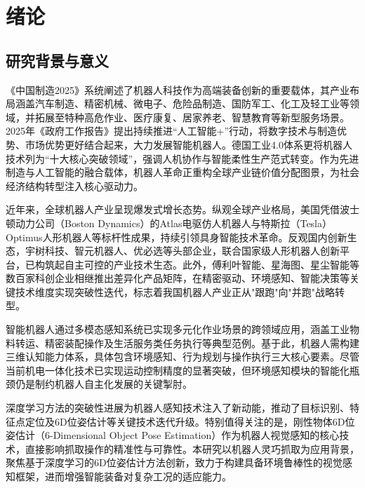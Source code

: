 \chapter{绪论}

\section{研究背景与意义}
《中国制造2025》\cite{中国制造2025}系统阐述了机器人科技作为高端装备创新的重要载体，其产业布局涵盖汽车制造、精密机械、微电子、危险品制造、国防军工、化工及轻工业等领域，并拓展至特种高危作业、医疗康复、居家养老、智慧教育等新型服务场景。2025年《政府工作报告》\cite{政府工作报告}提出持续推进“人工智能+”行动，将数字技术与制造优势、市场优势更好结合起来，大力发展智能机器人。德国工业4.0\cite{德国工业4.0}体系更将机器人技术列为“十大核心突破领域”，强调人机协作与智能柔性生产范式转变。作为先进制造与人工智能的融合载体，机器人革命正重构全球产业链价值分配图景，为社会经济结构转型注入核心驱动力。

近年来，全球机器人产业呈现爆发式增长态势\cite{2022中国智能机器人行业研究报告}。纵观全球产业格局，美国凭借波士顿动力公司（Boston Dynamics）的Atlas电驱仿人机器人与特斯拉（Tesla）Optimus人形机器人等标杆性成果，持续引领具身智能技术革命。反观国内创新生态，宇树科技、智元机器人、优必选等头部企业，联合国家级人形机器人创新平台，已构筑起自主可控的产业技术生态。此外，傅利叶智能、星海图、星尘智能等数百家科创企业相继推出差异化产品矩阵，在精密驱动、环境感知、智能决策等关键技术维度实现突破性迭代，标志着我国机器人产业正从"跟跑"向"并跑"战略转型。

智能机器人通过多模态感知系统已实现多元化作业场景的跨领域应用，涵盖工业物料转运、精密装配操作及生活服务类任务执行等典型范例。基于此，机器人需构建三维认知能力体系，具体包含环境感知、行为规划与操作执行三大核心要素\cite{蔡自兴2000机器人学}。尽管当前机电一体化技术已实现运动控制精度的显著突破\cite{doi:10.1177/02783649241285161}，但环境感知模块的智能化瓶颈仍是制约机器人自主化发展的关键掣肘\cite{doi:10.1126/scirobotics.adw1608}。

深度学习方法\cite{lecun2015deep}的突破性进展为机器人感知技术注入了新动能，推动了目标识别\cite{objectDetectionSurvey}、特征点定位\cite{keypointSurvey}及6D位姿估计\cite{poseEstimationSurvey}等关键技术迭代升级。特别值得关注的是，刚性物体6D位姿估计（6-Dimensional Object Pose Estimation）作为机器人视觉感知的核心技术，直接影响抓取操作的精准性与可靠性。本研究以机器人灵巧抓取为应用背景，聚焦基于深度学习的6D位姿估计方法创新，致力于构建具备环境鲁棒性的视觉感知框架，进而增强智能装备对复杂工况的适应能力。

